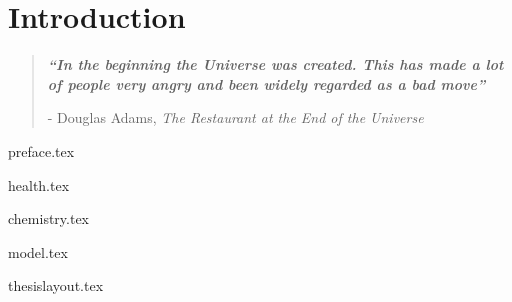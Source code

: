 

\chapter{ Introduction }


\blankpage
\restoregeometry
\vspace*{0.15\paperheight}


\begin{center}
\begin{quotation}
  \large{\emph{\textbf{``In the beginning the Universe was created.
This has made a lot of people very angry and been widely regarded as a bad move''} }  }  \\
  \begin{flushright}
  - Douglas Adams, \textit{The Restaurant at the End of the Universe}
  \end{flushright}
 \end{quotation}
\end{center}
\doublespacing
\newpage

% 
{preface.tex}

{health.tex}

{chemistry.tex}

{model.tex}

{thesislayout.tex}






\chapterbib






